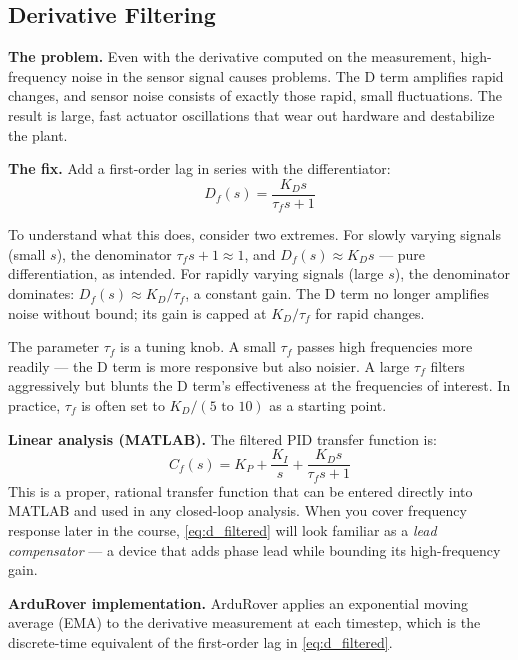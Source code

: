 \documentclass[../../book.tex]{subfiles}
\begin{document}
\subsection{Derivative Filtering}

\textbf{The problem.}
Even with the derivative computed on the measurement, high-frequency noise in
the sensor signal causes problems.  The D term amplifies rapid changes, and
sensor noise consists of exactly those rapid, small fluctuations.  The result
is large, fast actuator oscillations that wear out hardware and destabilize
the plant.

\textbf{The fix.}
Add a first-order lag in series with the differentiator:
\begin{equation}
  D_f(s) = \frac{K_D s}{\tau_f s + 1}
  \label{eq:d_filtered}
\end{equation}

To understand what this does, consider two extremes.  For slowly varying
signals (small $s$), the denominator $\tau_f s + 1 \approx 1$, and $D_f(s)
\approx K_D s$ --- pure differentiation, as intended.  For rapidly varying
signals (large $s$), the denominator dominates: $D_f(s) \approx K_D/\tau_f$,
a constant gain.  The D term no longer amplifies noise without bound; its gain
is capped at $K_D/\tau_f$ for rapid changes.

The parameter $\tau_f$ is a tuning knob.  A small $\tau_f$ passes high
frequencies more readily --- the D term is more responsive but also noisier.
A large $\tau_f$ filters aggressively but blunts the D term's effectiveness
at the frequencies of interest.  In practice, $\tau_f$ is often set to
$K_D/(5\text{ to }10)$ as a starting point.

\textbf{Linear analysis (MATLAB).}
The filtered PID transfer function is:
\begin{equation}
  C_f(s) = K_P + \frac{K_I}{s} + \frac{K_D s}{\tau_f s + 1}
  \label{eq:pid_filtered_tf}
\end{equation}
This is a proper, rational transfer function that can be entered directly
into MATLAB and used in any closed-loop analysis.  When you cover frequency
response later in the course, \cref{eq:d_filtered} will look familiar as a
\emph{lead compensator} --- a device that adds phase lead while bounding
its high-frequency gain.

\textbf{ArduRover implementation.}
ArduRover applies an exponential moving average (EMA) to the derivative
measurement at each timestep, which is the discrete-time equivalent of the
first-order lag in \cref{eq:d_filtered}.
\end{document}
